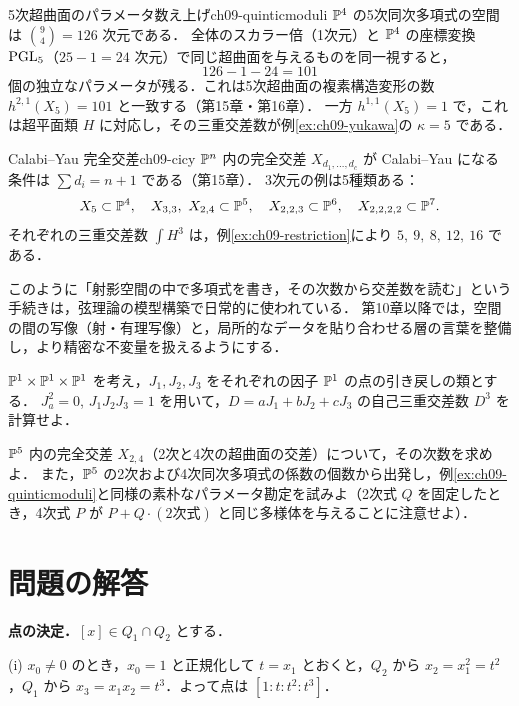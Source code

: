 \begin{myex}{5次超曲面のパラメータ数え上げ}{ch09-quinticmoduli}
$\mathbb{P}^4$ の5次同次多項式の空間は $\binom{9}{4}=126$ 次元である．
全体のスカラー倍（1次元）と $\mathbb{P}^4$ の座標変換 $\operatorname{PGL}_5$（$25-1=24$ 次元）で同じ超曲面を与えるものを同一視すると，
\[
  126-1-24=101
\]
個の独立なパラメータが残る．これは5次超曲面の複素構造変形の数 $h^{2,1}(X_5)=101$ と一致する（第15章・第16章）．
一方 $h^{1,1}(X_5)=1$ で，これは超平面類 $H$ に対応し，その三重交差数が例\ref{ex:ch09-yukawa}の $\kappa=5$ である．
\end{myex}

\begin{myex}{Calabi--Yau 完全交差}{ch09-cicy}
$\mathbb{P}^n$ 内の完全交差 $X_{d_1,\dots,d_c}$ が Calabi--Yau になる条件は $\sum d_i=n+1$ である（第15章）．
3次元の例は5種類ある：
\[
  X_5\subset\PP^4,\quad X_{3,3},\ X_{2,4}\subset\PP^5,\quad X_{2,2,3}\subset\PP^6,\quad X_{2,2,2,2}\subset\PP^7.
\]
それぞれの三重交差数 $\int H^3$ は，例\ref{ex:ch09-restriction}により $5,\ 9,\ 8,\ 12,\ 16$ である．
\end{myex}

このように「射影空間の中で多項式を書き，その次数から交差数を読む」という手続きは，弦理論の模型構築で日常的に使われている．
第10章以降では，空間の間の写像（射・有理写像）と，局所的なデータを貼り合わせる層の言葉を整備し，より精密な不変量を扱えるようにする．

$\mathbb{P}^1\times\mathbb{P}^1\times\mathbb{P}^1$ を考え，$J_1,J_2,J_3$ をそれぞれの因子 $\mathbb{P}^1$ の点の引き戻しの類とする．
$J_a^2=0$, $J_1J_2J_3=1$ を用いて，$D=aJ_1+bJ_2+cJ_3$ の自己三重交差数 $D^3$ を計算せよ．

$\mathbb{P}^5$ 内の完全交差 $X_{2,4}$（2次と4次の超曲面の交差）について，その次数を求めよ．
また，$\mathbb{P}^5$ の2次および4次同次多項式の係数の個数から出発し，例\ref{ex:ch09-quinticmoduli}と同様の素朴なパラメータ勘定を試みよ（2次式 $Q$ を固定したとき，4次式 $P$ が $P+Q\cdot(\text{2次式})$ と同じ多様体を与えることに注意せよ）．

\section*{問題の解答}

\textbf{点の決定．}$[x]\in Q_1\cap Q_2$ とする．

(i) $x_0\neq0$ のとき，$x_0=1$ と正規化して $t=x_1$ とおくと，$Q_2$ から $x_2=x_1^2=t^2$，$Q_1$ から $x_3=x_1x_2=t^3$．よって点は $[1:t:t^2:t^3]$．

